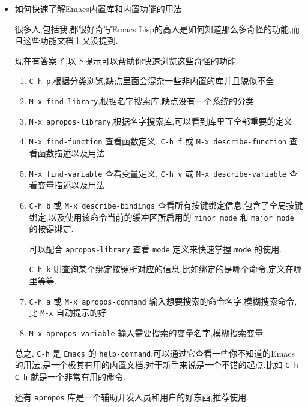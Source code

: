 \documentclass[11pt]{article}
\begin{document}
\begin{itemize}
\item 如何快速了解Emacs内置库和内置功能的用法

很多人,包括我,都很好奇写Emacs Lisp的高人是如何知道那么多奇怪的功能,而且这些功能文档上又没提到.

现在有答案了,以下提示可以帮助你快速浏览这些奇怪的功能.

\begin{enumerate}
\item \texttt{C-h p},根据分类浏览,缺点里面会混杂一些非内置的库并且貌似不全

\item \texttt{M-x find-library},根据名字搜索库,缺点没有一个系统的分类

\item \texttt{M-x apropos-library},根据名字搜索库,可以看到库里面全部重要的定义

\item \texttt{M-x find-function} 查看函数定义, \texttt{C-h f} 或 \texttt{M-x describe-function} 查看函数描述以及用法

\item \texttt{M-x find-variable} 查看变量定义, \texttt{C-h v} 或 \texttt{M-x describe-variable} 查看变量描述以及用法

\item \texttt{C-h b} 或 \texttt{M-x describe-bindings} 查看所有按键绑定信息,包含了全局按键绑定,以及使用该命令当前的缓冲区所启用的 \texttt{minor mode} 和 \texttt{major mode} 的按键绑定.

可以配合 \texttt{apropos-library} 查看 \texttt{mode} 定义来快速掌握 \texttt{mode} 的使用.

\texttt{C-h k} 则查询某个绑定按键所对应的信息,比如绑定的是哪个命令,定义在哪里等等.

\item \texttt{C-h a} 或 \texttt{M-x apropos-command} 输入想要搜索的命令名字,模糊搜索命令,比 \texttt{M-x} 自动提示的好

\item \texttt{M-x apropos-variable} 输入需要搜索的变量名字,模糊搜索变量
\end{enumerate}

总之, \texttt{C-h} 是 \texttt{Emacs} 的 \texttt{help-command},可以通过它查看一些你不知道的Emacs的用法,是一个极其有用的内置文档,对于新手来说是一个不错的起点.比如 \texttt{C-h C-h} 就是一个非常有用的命令.

还有 \texttt{apropos} 库是一个辅助开发人员和用户的好东西,推荐使用.


\end{itemize}
\end{document}
